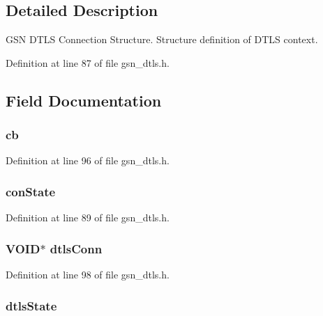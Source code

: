 \subsection{Detailed Description}
GSN DTLS Connection Structure. Structure definition of DTLS context. 

Definition at line 87 of file gsn\_\-dtls.h.



\subsection{Field Documentation}
\hypertarget{a00057_a027e6443bb2199b98001953fdd15eff2}{
\subsubsection[{cb}]{ {\bf cb}}}
\label{a00057_a027e6443bb2199b98001953fdd15eff2}


Definition at line 96 of file gsn\_\-dtls.h.

\hypertarget{a00057_a3c2c5d096f2f91987003abb0570f3b1c}{
\subsubsection[{conState}]{ {\bf conState}}}
\label{a00057_a3c2c5d096f2f91987003abb0570f3b1c}


Definition at line 89 of file gsn\_\-dtls.h.

\hypertarget{a00057_aaf4ac5ae4dc1f65b994105ff581f4b2a}{
\subsubsection[{dtlsConn}]{\setlength{\rightskip}{0pt plus 5cm}VOID$\ast$ {\bf dtlsConn}}}
\label{a00057_aaf4ac5ae4dc1f65b994105ff581f4b2a}


Definition at line 98 of file gsn\_\-dtls.h.

\hypertarget{a00057_a591bc617ecbe65923ee7d8b7ce93ab9a}{
\subsubsection[{dtlsState}]{ {\bf dtlsState}}}
\label{a00057_a591bc617ecbe65923ee7d8b7ce93ab9a}


